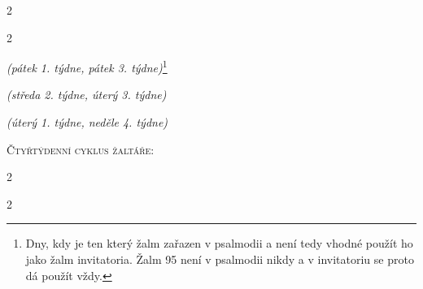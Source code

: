 \documentclass[a5paper, twoside]{article}
\newenvironment{hora}{
  \begin{multicols}{2}
}{
  \end{multicols}
}
\begin{document}
\begin{hora}
\label{benedictus}

\columnbreak
\label{magnificat}


\end{hora}


\begin{hora}
\label{zalm95}




{\footnotesize \noindent \textit{(pátek 1. týdne, pátek 3. týdne)}\footnote{
Dny, kdy je ten který žalm zařazen v psalmodii a není tedy vhodné použít ho
jako žalm invitatoria. Žalm 95 není v psalmodii nikdy a v invitatoriu se proto
dá použít vždy.}}



{\footnotesize \noindent \textit{(středa 2. týdne, úterý 3. týdne)}}

\label{z24}


{\footnotesize \noindent \textit{(úterý 1. týdne, neděle 4. týdne)}}

\end{hora}

\clearpage

\begin{center}
{\LARGE \textsc{Čtyřtýdenní cyklus žaltáře:}}
\end{center}



\nesporyI
\begin{hora}


\label{kantfp2}

\end{hora}

\modlitbaSeCtenim
\begin{hora}
\label{z1}

\label{z2}

\label{z3}

\versikTInedeleCteni
\end{hora}
\end{document}
